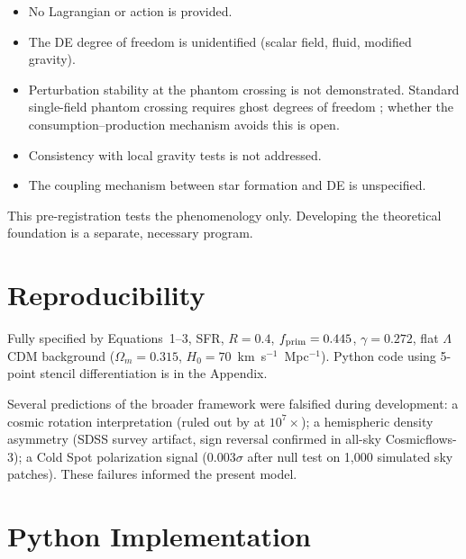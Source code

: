 \documentclass[12pt,preprint]{aastex631}
\begin{document}
\begin{itemize}
\item No Lagrangian or action is provided.
\item The DE degree of freedom is unidentified (scalar field, fluid, modified gravity).
\item Perturbation stability at the phantom crossing is not demonstrated. Standard single-field phantom crossing requires ghost degrees of freedom \citep{Vikman2005}; whether the consumption--production mechanism avoids this is open.
\item Consistency with local gravity tests is not addressed.
\item The coupling mechanism between star formation and DE is unspecified.
\end{itemize}

This pre-registration tests the phenomenology only. Developing the theoretical foundation is a separate, necessary program.

\section{Reproducibility}

Fully specified by Equations~1--3, \citet{MadauDickinson2014} SFR, $R = 0.4$, $f_{\rm prim} = 0.445$, $\gamma = 0.272$, flat $\Lambda$CDM background ($\Omega_m = 0.315$, $H_0 = 70$~km~s$^{-1}$~Mpc$^{-1}$). Python code using 5-point stencil differentiation is in the Appendix.

\acknowledgments

Several predictions of the broader framework were falsified during development: a cosmic rotation interpretation (ruled out by \citealt{Saadeh2016} at $10^7\times$); a hemispheric density asymmetry (SDSS survey artifact, sign reversal confirmed in all-sky Cosmicflows-3); a Cold Spot polarization signal ($0.003\sigma$ after null test on 1,000 simulated sky patches). These failures informed the present model.

\appendix

\section{Python Implementation}
\end{document}
